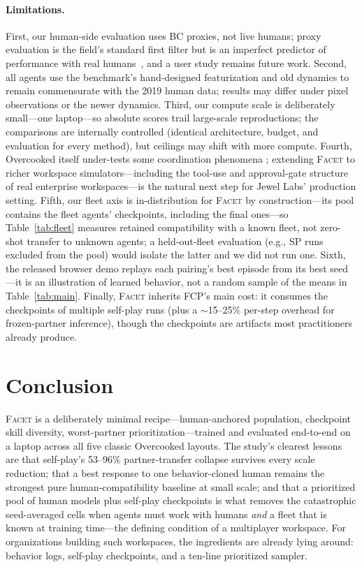 \documentclass[11pt]{article}
\newcommand{\facet}{\textsc{Facet}}
\begin{document}
\paragraph{Limitations.}
First, our human-side evaluation uses BC proxies, not live humans; proxy
evaluation is the field's standard first filter but is an imperfect
predictor of performance with real
humans~\citep{strouse2021collaborating,wang2024zsceval}, and a user study
remains future work. Second, all agents use the benchmark's
hand-designed featurization and old dynamics to remain commensurate with the
2019 human data; results may differ under pixel observations or the newer
dynamics. Third, our compute scale is deliberately small---one laptop---so
absolute scores trail large-scale reproductions; the comparisons are
internally controlled (identical architecture, budget, and evaluation for
every method), but ceilings may shift with more compute. Fourth,
Overcooked itself under-tests some coordination phenomena
\citep{gessler2025overcookedv2}; extending \facet{} to richer workspace
simulators---including the tool-use and approval-gate structure of real
enterprise workspaces---is the natural next step for Jewel Labs'
production setting. Fifth, our fleet axis is in-distribution for \facet{}
by construction---its pool contains the fleet agents' checkpoints,
including the final ones---so Table~\ref{tab:fleet} measures retained
compatibility with a known fleet, not zero-shot transfer to unknown
agents; a held-out-fleet evaluation (e.g., SP runs excluded from the pool)
would isolate the latter and we did not run one. Sixth, the released
browser demo replays each pairing's best episode from its best seed---it
is an illustration of learned behavior, not a random sample of the means
in Table~\ref{tab:main}. Finally, \facet{} inherits FCP's main cost: it
consumes the checkpoints of multiple self-play runs (plus a
$\sim$15--25\% per-step overhead for frozen-partner inference), though
the checkpoints are artifacts most practitioners already produce.

\section{Conclusion}
\label{sec:conclusion}

\facet{} is a deliberately minimal recipe---human-anchored population,
checkpoint skill diversity, worst-partner prioritization---trained and
evaluated end-to-end on a laptop across all five classic Overcooked
layouts. The study's clearest lessons are that self-play's 53--96\%
partner-transfer collapse survives every scale reduction; that a best
response to one behavior-cloned human remains the strongest pure
human-compatibility baseline at small scale; and that a prioritized pool
of human models plus self-play checkpoints is what removes the
catastrophic seed-averaged cells when agents must work with humans
\emph{and} a fleet that is known at training time---the defining
condition of a multiplayer workspace. For
organizations building such workspaces, the ingredients are already lying
around: behavior logs, self-play checkpoints, and a ten-line prioritized
sampler.
\end{document}

